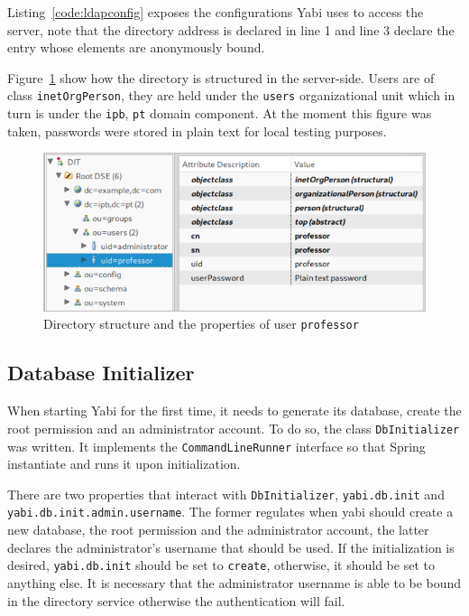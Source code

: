 Listing~\ref{code:ldapconfig} exposes the configurations \gls{Yabi} uses to access the server, note that the directory address is declared in line 1 and line 3 declare the entry whose elements are anonymously bound.



Figure~\ref{fig:adsconfig} show how the directory is structured in the server-side. Users are of class \texttt{inetOrgPerson}, they are held under the \texttt{users} organizational unit which in turn is under the \texttt{ipb}, \texttt{pt} domain component. At the moment this figure was taken, passwords were stored in plain text for local testing purposes.

\begin{figure}
  \centering
  \includegraphics[width=.8\textwidth]{images/screenshots/ldap-directory}
  \caption{Directory structure and the properties of user \texttt{professor}}\label{fig:adsconfig}
\end{figure}

\subsection{Database Initializer}
When starting \gls{Yabi} for the first time, it needs to generate its database, create the root permission and an administrator account.
To do so, the class \texttt{DbInitializer} was written. It implements the \texttt{CommandLineRunner} interface so that Spring instantiate and runs it upon initialization.

There are two properties that interact with \texttt{DbInitializer}, \texttt{yabi.db.init} and \texttt{yabi.db.init.admin.username}. The former regulates when yabi should create a new database, the root permission and the administrator account, the latter declares the administrator's username that should be used. If the initialization is desired, \texttt{yabi.db.init} should be set to \texttt{create}, otherwise, it should be set to anything else. It is necessary that the administrator username is able to be bound in the directory service otherwise the authentication will fail.

